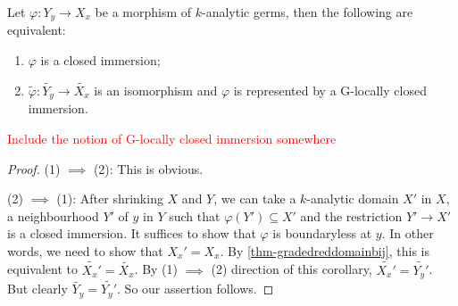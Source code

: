 \begin{corollary}\label{cor-closedimmersionintermsofreduction}
    Let $\varphi:Y_y\rightarrow X_x$ be a morphism of $k$-analytic germs, then the following are equivalent:
    \begin{enumerate}
        \item $\varphi$ is a closed immersion;
        \item $\tilde{\varphi}:\widetilde{Y_y}\rightarrow \widetilde{X_x}$ is an isomorphism and $\varphi$ is represented by a G-locally closed immersion. 
    \end{enumerate}
\end{corollary}
\textcolor{red}{Include the notion of G-locally closed immersion somewhere}
\begin{proof}
    (1) $\implies$ (2): This is obvious.

    (2) $\implies$ (1): After shrinking $X$ and $Y$, we can take a $k$-analytic domain $X'$ in $X$, a neighbourhood $Y'$ of $y$ in $Y$ such that $\varphi(Y')\subseteq X'$ and the restriction $Y'\rightarrow X'$ is a closed immersion. It suffices to show that $\varphi$ is boundaryless at $y$. In other words, we need to show that $X_x'=X_x$. By \cref{thm-gradedreddomainbij}, this is equivalent to $\widetilde{X_x'}=\widetilde{X_x}$. By (1) $\implies$ (2) direction of this corollary, $\widetilde{X_x'}=\widetilde{Y_y'}$. But clearly $\widetilde{Y_y}=\widetilde{Y_y'}$. So our assertion follows.
\end{proof}


